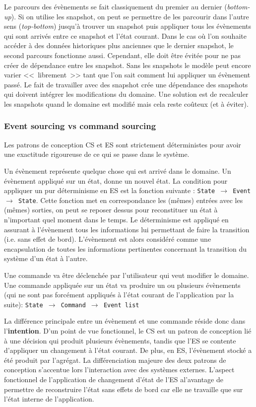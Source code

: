 	Le parcours des évènements se fait classiquement du premier au dernier 
	(\textit{bottom-up}). Si on utilise les \gls{snapshot}, on peut se permettre de les 
	parcourir dans l'autre sens (\textit{top-bottom}) jusqu'à trouver un \gls{snapshot} 
	puis appliquer tous les évènements qui sont arrivés entre ce \gls{snapshot} et 
	l'état courant. Dans le cas où l'on souhaite accéder à des données historiques 
	plus anciennes que le dernier \gls{snapshot}, le second parcours fonctionne 
	aussi. Cependant, elle doit être évitée pour ne pas créer de dépendance entre 
	les \gls{snapshot}. Sans les snapshots le modèle peut encore varier 
	<<~librement~>> tant que l'on sait comment lui appliquer un évènement passé. 
	Le fait de travailler avec des \gls{snapshot} crée une dépendance des 
	snapshots qui doivent intégrer les modifications du domaine. Une solution est 
	de recalculer les snapshots quand le domaine est modifié mais cela reste 
	coûteux (et à éviter).
	

\subsubsection{Event sourcing vs command sourcing}
Les patrons de conception \gls{CS} et \gls{ES} sont strictement déterministes pour 
avoir une exactitude rigoureuse de ce qui se passe dans le système.

Un évènement représente quelque chose qui est arrivé dans le domaine. Un 
évènement appliqué sur un état, donne un nouvel état. 
La condition pour appliquer un pur déterminisme en \gls{ES} est la fonction 
suivante : \texttt{State $\rightarrow$ Event $\rightarrow$ State}. Cette fonction met 
en correspondance les (mêmes) entrées avec les (mêmes) sorties, on peut se 
reposer dessus pour reconstituer un état à n'important quel moment dans le 
temps. Le déterminisme est appliqué en assurant à l'évènement tous les 
informations lui permettant de faire la transition (i.e. sans effet de bord). 
L'évènement est alors considéré comme une encapsulation de toutes les 
informations pertinentes concernant la transition du système d'un état à l'autre.

Une commande va être déclenchée par l'utilisateur qui veut modifier le domaine. 
Une commande appliquée sur un état va produire un ou plusieurs évènements (qui 
ne sont pas forcément appliqués à l'état courant de l'application par la suite): 
\texttt{State $\rightarrow$ Command $\rightarrow$ Event list}

La différence principale entre un évènement et une commande réside donc dans 
l'\textbf{intention}. D'un point de vue fonctionnel, le \gls{CS} est un patron de 
conception lié à une décision qui produit plusieurs évènements, tandis que 
l'\gls{ES} se contente d'appliquer un changement à l'état courant. De plus, en 
\gls{ES}, l'évènement stocké a été produit par l'agrégat. 
La différenciation majeure des deux patrons de conception s'accentue lors 
l'interaction avec des systèmes externes. L'aspect fonctionnel de l'application de 
changement d'état de l'\gls{ES} al'avantage de permettre de reconstruire l'état sans 
effets de bord car elle ne travaille que sur l'état interne de l'application. 

